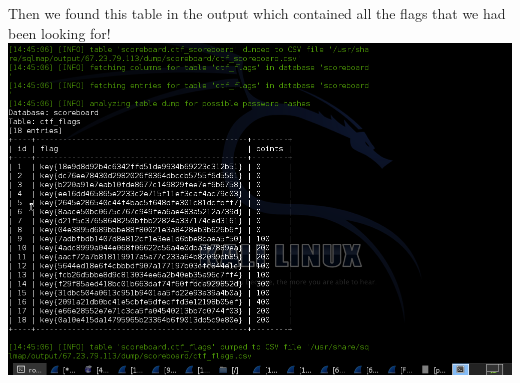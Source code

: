 \documentclass[12pt]{article}
\begin{document}
\begin{enumerate}[1.]
Then we found this table in the output which contained all the flags that we had been looking for! \\

\includegraphics[scale=0.45]{images/extra2}

\end{enumerate}
\end{document}
